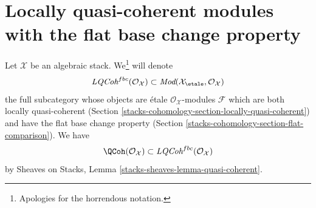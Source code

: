 \section{Locally quasi-coherent modules with the flat base change property}
\label{stacks-cohomology-section-loc-qcoh-flat-base-change}
Let $\mathcal{X}$ be an algebraic stack. We\footnote{Apologies
for the horrendous notation.} will denote
$$
\textit{LQCoh}^{fbc}(\mathcal{O}_\mathcal{X})
\subset
\textit{Mod}(\mathcal{X}_\etale, \mathcal{O}_\mathcal{X})
$$
the full subcategory whose objects are \'etale
$\mathcal{O}_\mathcal{X}$-modules $\mathcal{F}$
which are both locally quasi-coherent
(Section \ref{stacks-cohomology-section-locally-quasi-coherent})
and have the flat base change property
(Section \ref{stacks-cohomology-section-flat-comparison}).
We have
$$
\QCoh(\mathcal{O}_\mathcal{X}) \subset
\textit{LQCoh}^{fbc}(\mathcal{O}_\mathcal{X})
$$
by Sheaves on Stacks, Lemma \ref{stacks-sheaves-lemma-quasi-coherent}.

